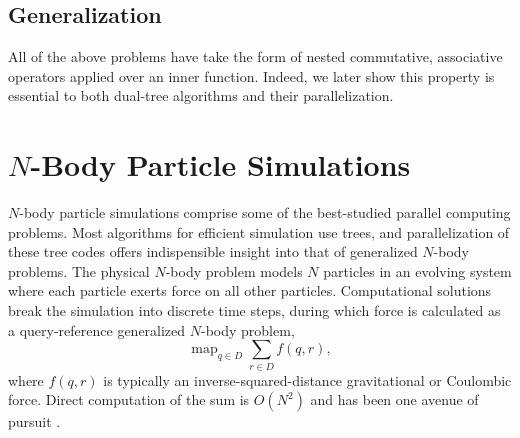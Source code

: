 \documentclass[twoside,leqno,twocolumn]{article}
\DeclareMathOperator*{\map}{map}
\DeclareMathOperator*{\argmin}{argmin}
\newcommand{\mysub}[1]{\subsection{#1} }
\newcommand{\ocpos}[1]{c^{+}_{#1}}
\newcommand{\cpos}[2]{\ocpos{#1 \neq #2}}
\newcommand{\simil}[2]{S_{#1#2}}
\newcommand{\vecrho}{\vec{\rho}}
\newcommand{\vecalpha}{\vec{\alpha}}
\newcommand{\frho}[1]{\rho_{#1}}
\newcommand{\falpha}[1]{\alpha_{#1}}
\newcommand{\falphaj}[2]{\alpha_{#1[#2]}}
\begin{document}

\mysub{Generalization}
All of the above problems have take the form of nested commutative, associative operators applied over an inner function.
Indeed, we later show this property is essential to both dual-tree algorithms and their parallelization.

\section{$N$-Body Particle Simulations}

$N$-body particle simulations comprise some of the best-studied parallel computing problems.
Most algorithms for efficient simulation use trees, and parallelization of these tree codes offers indispensible insight into that of generalized $N$-body problems.
The physical $N$-body problem models $N$ particles in an evolving system where each particle exerts force on all other particles.
Computational solutions break the simulation into discrete time steps, during which force is calculated as a query-reference generalized $N$-body problem,
\[\map_{q \in D} \sum_{r \in D} f(q,r),\]
\noindent where $f(q,r)$ is typically an inverse-squared-distance gravitational or Coulombic force.
Direct computation of the sum is $O(N^2)$ and has been one avenue of pursuit \cite{grape}.
\end{document}
